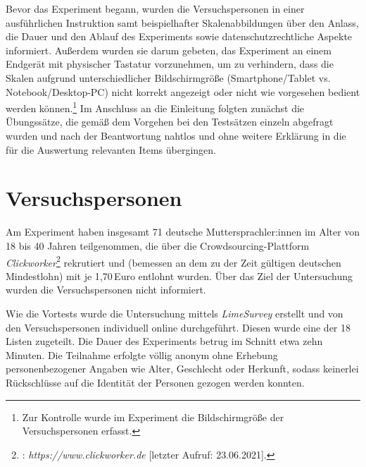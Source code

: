 Bevor das Experiment begann, wurden die Versuchspersonen in einer ausführlichen Instruktion samt beispielhafter Skalenabbildungen über den Anlass, die Dauer und den Ablauf des Experiments sowie datenschutzrechtliche Aspekte informiert. Außerdem wurden sie darum gebeten, das Experiment an einem Endgerät mit physischer Tastatur vorzunehmen, um zu verhindern, dass die Skalen aufgrund unterschiedlicher Bildschirmgröße (Smartphone/Tablet vs. Notebook/Desktop-PC) nicht korrekt angezeigt oder nicht wie vorgesehen bedient werden können.\footnote{Zur Kontrolle wurde im Experiment die Bildschirmgröße der {Versuchspersonen erfasst}.} Im Anschluss an die Einleitung folgten zunächst die Übungssätze, die gemäß dem Vorgehen bei den Testsätzen einzeln abgefragt wurden und nach der Beantwortung nahtlos und ohne weitere Erklärung in die für die Auswertung relevanten {Items übergingen}.





\section{Versuchspersonen}\label{abs:Versuchspersonen1}
Am Experiment haben insgesamt 71 deutsche Muttersprachler:innen im Alter von 18 bis 40 Jahren teilgenommen, die über die Crowdsourcing-Plattform \textit{Clickworker}\footnote{\citet[]{Rozsenich.2020}: \textit{https://www.clickworker.de} [letzter Aufruf: 23.06.2021].} rekrutiert und (bemessen an dem zu der Zeit gültigen deutschen Mindestlohn) mit je 1,70\,Euro entlohnt wurden. Über das Ziel der Untersuchung wurden die Versuchspersonen nicht informiert.


Wie die Vortests wurde die Untersuchung mittels \textit{LimeSurvey} erstellt und von den Versuchspersonen individuell online durchgeführt. Diesen wurde eine der 18 Listen zugeteilt. Die Dauer des Experiments betrug im Schnitt etwa zehn Minuten. Die Teilnahme erfolgte völlig anonym ohne Erhebung personenbezogener Angaben wie Alter, Geschlecht oder Herkunft, sodass keinerlei Rückschlüsse auf die Identität der Personen gezogen werden {konnten}.


